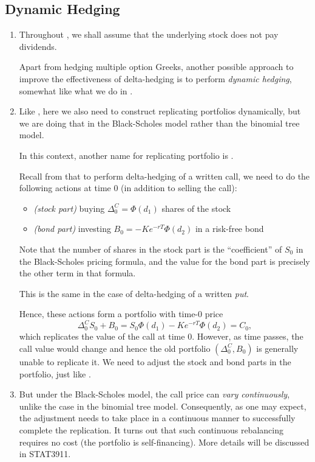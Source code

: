 \subsection{Dynamic Hedging}
\label{subsect:dynamic-hedge-greeks}
\begin{enumerate}
\item Throughout , we shall assume that the
underlying stock does not pay dividends.

Apart from hedging multiple option Greeks, another possible approach to improve
the effectiveness of delta-hedging is to perform \emph{dynamic hedging},
somewhat like what we do in .

\item Like , here we also need to construct
replicating portfolios dynamically, but we are doing that in the Black-Scholes
model rather than the binomial tree model. \begin{note}
In this context, another name for replicating portfolio is .
\end{note}
Recall from  that to perform delta-hedging of a
written call, we need to do the following actions at time 0 (in addition to
selling the call):
\begin{itemize}
\item \emph{(stock part)} buying \(\Delta_0^C=\Phi(d_1)\) shares of the stock 
\item \emph{(bond part)} investing \(B_0=-Ke^{-rT}\Phi(d_2)\) in a risk-free
bond
\end{itemize}
Note that the number of shares in the stock part is the ``coefficient'' of
\(S_0\) in the Black-Scholes pricing formula, and the value for the bond part
is precisely the other term in that formula. \begin{note}
This is the same in the case of delta-hedging of a written \emph{put}.
\end{note}

Hence, these actions form a portfolio with time-0 price
\[
\Delta_0^CS_0+B_0=S_0\Phi(d_1)-Ke^{-rT}\Phi(d_2)=C_0,
\]
which replicates the value of the call at time 0. However, as time passes, the
call value would change and hence the old portfolio \((\Delta_0^C,B_0)\) is
generally unable to replicate it. We need to adjust the stock and bond parts in
the portfolio, just like .

\item But under the Black-Scholes model, the call price can \emph{vary
continuously}, unlike the case in the binomial tree model. Consequently, as one
may expect, the adjustment needs to take place in a continuous manner to
successfully complete the replication. It turns out that such continuous
rebalancing requires no cost (the portfolio is self-financing). More details
will be discussed in STAT3911.


\end{enumerate}
